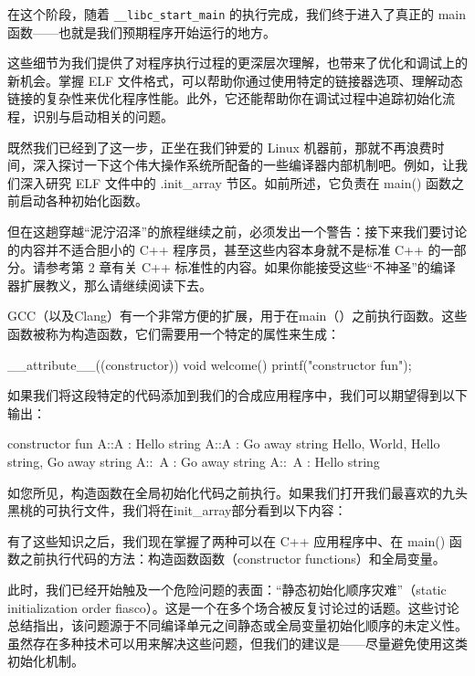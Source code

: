 在这个阶段，随着 \verb|__libc_start_main| 的执行完成，我们终于进入了真正的 main 函数——也就是我们预期程序开始运行的地方。

这些细节为我们提供了对程序执行过程的更深层次理解，也带来了优化和调试上的新机会。掌握 ELF 文件格式，可以帮助你通过使用特定的链接器选项、理解动态链接的复杂性来优化程序性能。此外，它还能帮助你在调试过程中追踪初始化流程，识别与启动相关的问题。


既然我们已经到了这一步，正坐在我们钟爱的 Linux 机器前，那就不再浪费时间，深入探讨一下这个伟大操作系统所配备的一些编译器内部机制吧。例如，让我们深入研究 ELF 文件中的 .init\_array 节区。如前所述，它负责在 main() 函数之前启动各种初始化函数。

但在这趟穿越“泥泞沼泽”的旅程继续之前，必须发出一个警告：接下来我们要讨论的内容并不适合胆小的 C++ 程序员，甚至这些内容本身就不是标准 C++ 的一部分。请参考第 2 章有关 C++ 标准性的内容。如果你能接受这些“不神圣”的编译器扩展教义，那么请继续阅读下去。

GCC（以及Clang）有一个非常方便的扩展，用于在main（）之前执行函数。这些函数被称为构造函数，它们需要用一个特定的属性来生成：

\begin{cpp}
__attribute__((constructor)) void welcome() {
printf("constructor fun\n");
}
\end{cpp}

如果我们将这段特定的代码添加到我们的合成应用程序中，我们可以期望得到以下输出：

\begin{shell}
constructor fun
A::A : Hello string
A::A : Go away string
Hello, World, Hello string, Go away string
A::~A : Go away string
A::~A : Hello string
\end{shell}

如您所见，构造函数在全局初始化代码之前执行。如果我们打开我们最喜欢的九头黑桃的可执行文件，我们将在init\_array部分看到以下内容：


有了这些知识之后，我们现在掌握了两种可以在 C++ 应用程序中、在 main() 函数之前执行代码的方法：构造函数函数（constructor functions）和全局变量。

此时，我们已经开始触及一个危险问题的表面：“静态初始化顺序灾难”（static initialization order fiasco）。这是一个在多个场合被反复讨论过的话题。这些讨论总结指出，该问题源于不同编译单元之间静态或全局变量初始化顺序的未定义性。虽然存在多种技术可以用来解决这些问题，但我们的建议是——尽量避免使用这类初始化机制。

